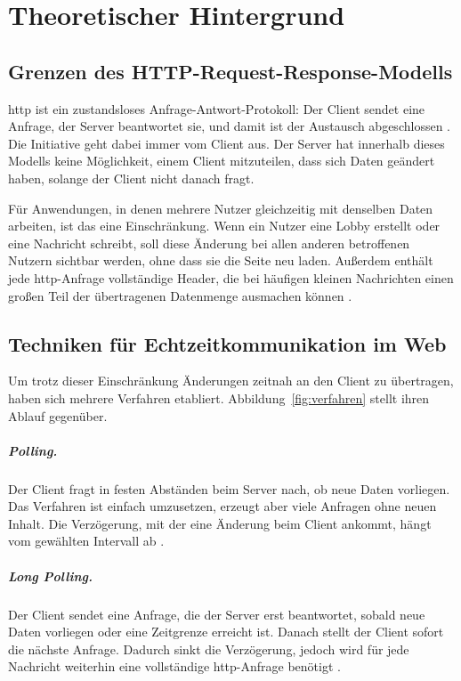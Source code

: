 \chapter{Theoretischer Hintergrund}
\label{kap:grundlagen}
\verfasser{\autorSE}

\section{Grenzen des HTTP-Request-Response-Modells}
\label{sec:http}

\gls{http} ist ein zustandsloses Anfrage-Antwort-Protokoll: Der Client sendet eine Anfrage, der Server beantwortet sie, und damit ist der Austausch abgeschlossen \X[RFC 9110]. Die Initiative geht dabei immer vom Client aus. Der Server hat innerhalb dieses Modells keine Möglichkeit, einem Client mitzuteilen, dass sich Daten geändert haben, solange der Client nicht danach fragt.

Für Anwendungen, in denen mehrere Nutzer gleichzeitig mit denselben Daten arbeiten, ist das eine Einschränkung. Wenn ein Nutzer eine Lobby erstellt oder eine Nachricht schreibt, soll diese Änderung bei allen anderen betroffenen Nutzern sichtbar werden, ohne dass sie die Seite neu laden. Außerdem enthält jede \gls{http}-Anfrage vollständige Header, die bei häufigen kleinen Nachrichten einen großen Teil der übertragenen Datenmenge ausmachen können \X[Grigorik 2013].

\section{Techniken für Echtzeitkommunikation im Web}
\label{sec:techniken}

Um trotz dieser Einschränkung Änderungen zeitnah an den Client zu übertragen, haben sich mehrere Verfahren etabliert. Abbildung~\ref{fig:verfahren} stellt ihren Ablauf gegenüber.

\paragraph{Polling.} Der Client fragt in festen Abständen beim Server nach, ob neue Daten vorliegen. Das Verfahren ist einfach umzusetzen, erzeugt aber viele Anfragen ohne neuen Inhalt. Die Verzögerung, mit der eine Änderung beim Client ankommt, hängt vom gewählten Intervall ab \X[RFC 6202].

\paragraph{Long Polling.} Der Client sendet eine Anfrage, die der Server erst beantwortet, sobald neue Daten vorliegen oder eine Zeitgrenze erreicht ist. Danach stellt der Client sofort die nächste Anfrage. Dadurch sinkt die Verzögerung, jedoch wird für jede Nachricht weiterhin eine vollständige \gls{http}-Anfrage benötigt \X[RFC 6202].

